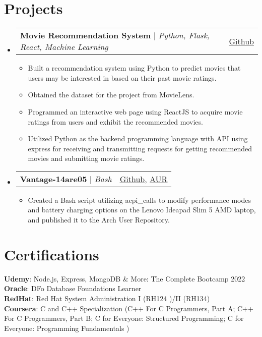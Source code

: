 \documentclass[a4paper,11pt]{article}
\makeatletter
\newcommand{\resumeItem}[1]{
    \item\small{
        {#1 \vspace{-2pt}}
    }
}
\newcommand{\resumeProjectHeading}[2]{
    \item
    \begin{tabular*}{0.97\textwidth}{l@{\extracolsep{\fill}}r}
        \small#1 & #2 \\
    \end{tabular*}\vspace{-7pt}
}
\newcommand{\resumeSubHeadingListStart}{\begin{itemize}[leftmargin=0.15in, label={}]}
\newcommand{\resumeSubHeadingListEnd}{\end{itemize}}
\newcommand{\resumeItemListStart}{\begin{itemize}}
\newcommand{\resumeItemListEnd}{\end{itemize}\vspace{-5pt}}
\makeatother
\begin{document}
\section{Projects}
\resumeSubHeadingListStart
\resumeProjectHeading
{\textbf{Movie Recommendation System} $|$ \emph{Python, Flask, React, Machine Learning}}{\href{https://github.com/ayushjaipuriyar/movie-recommendation-engine}{\underline{Github}}}
\resumeItemListStart
\resumeItem {Built a recommendation system using Python to predict movies that users may be interested in based on their past movie ratings.}
\resumeItem {Obtained the dataset for the project from MovieLens.}
\resumeItem {Programmed an interactive web page using ReactJS to acquire movie ratings from users and exhibit the recommended movies.}
\resumeItem {Utilized Python as the backend programming language with API using express for receiving and transmitting requests for getting recommended movies and submitting movie ratings.}
\resumeItemListEnd
\resumeProjectHeading
{\textbf{Vantage-14are05} $|$ \emph{Bash}}
{
    \href{https://github.com/ayushjaipuriyar/vantage-14are05}{\underline{Github}},
    \href{https://aur.archlinux.org/packages/vantage-14are05-git}{\underline{AUR}}
}
\resumeItemListStart
\resumeItem {Created a Bash script utilizing acpi\_calls to modify performance modes and battery charging options on the Lenovo Ideapad Slim 5 AMD laptop, and published it to the Arch User Repository.}
\resumeItemListEnd
\resumeSubHeadingListEnd




\section{Certifications}
\begin{itemize}[leftmargin=0.15in, label={}]
    \small{\item{
                    \textbf{Udemy}{: Node.js, Express, MongoDB \& More: The Complete Bootcamp 2022} \\
                    \textbf{Oracle}{: DFo Database Foundations Learner} \\
                    \textbf{RedHat}{: Red Hat System Administration I (RH124 )/II (RH134)} \\
                    \textbf{Coursera}{: C and C++ Specialization (C++ For C Programmers, Part A; C++ For C Programmers, Part B; C for Everyone: Structured Programming; C for Everyone: Programming Fundamentals
                        )}
              }}
\end{itemize}

\end{document}
